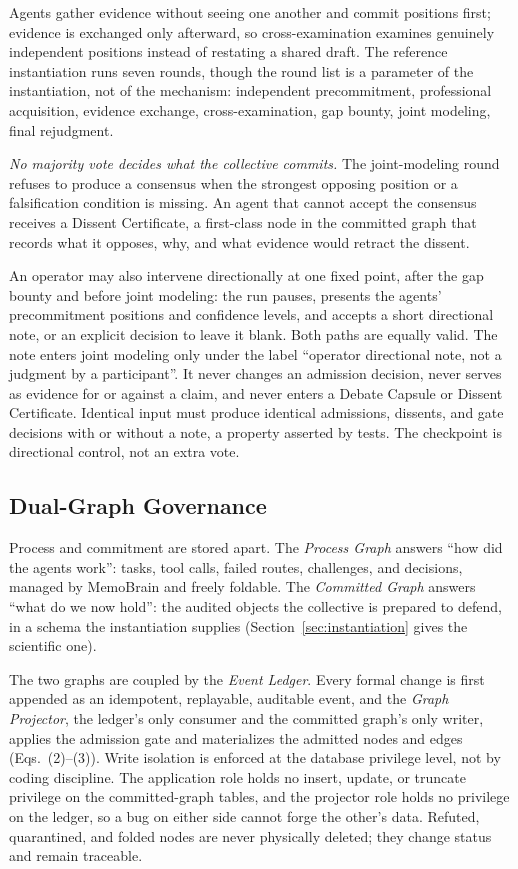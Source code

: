 Agents gather evidence without seeing one another and commit positions first;
evidence is exchanged only afterward, so cross-examination examines genuinely
independent positions instead of restating a shared draft. The reference
instantiation runs seven rounds, though the round list is a parameter of the
instantiation, not of the mechanism: independent precommitment,
professional acquisition, evidence exchange, cross-examination, gap bounty,
joint modeling, final rejudgment.

\emph{No majority vote decides what the collective commits.} The joint-modeling
round refuses to produce a consensus when the strongest opposing position or a
falsification condition is missing. An agent that cannot accept the consensus
receives a Dissent Certificate, a first-class node in the committed graph that
records what it opposes, why, and what evidence would retract the dissent.

An operator may also intervene directionally at one fixed point, after the gap
bounty and before joint modeling: the run pauses, presents the agents'
precommitment positions and confidence levels, and accepts a short directional
note, or an explicit decision to leave it blank. Both paths are equally valid.
The note enters joint modeling only under the label ``operator directional
note, not a judgment by a participant''. It never changes an admission
decision, never serves as evidence for or against a claim, and never enters a
Debate Capsule or Dissent Certificate. Identical input must produce identical
admissions, dissents, and gate decisions with or without a note, a property
asserted by tests. The checkpoint is directional control, not an extra vote.

\subsection{Dual-Graph Governance}
\label{sec:dualgraph}

Process and commitment are stored apart. The \emph{Process Graph} answers ``how
did the agents work'': tasks, tool calls, failed routes, challenges, and
decisions, managed by MemoBrain and freely foldable. The \emph{Committed Graph}
answers ``what do we now hold'': the audited objects the collective is prepared
to defend, in a schema the instantiation supplies
(Section~\ref{sec:instantiation} gives the scientific one).

The two graphs are coupled by the \emph{Event Ledger}. Every formal change is
first appended as an idempotent, replayable, auditable event, and the
\emph{Graph Projector}, the ledger's only consumer and the committed graph's
only writer, applies the admission gate and materializes the admitted nodes and
edges (Eqs.~(2)--(3)). Write isolation is enforced at the database privilege
level, not by coding discipline. The application role holds no insert, update,
or truncate privilege on the committed-graph tables, and the projector role
holds no privilege on the ledger, so a bug on either side cannot forge the
other's data. Refuted, quarantined, and folded nodes are never physically
deleted; they change status and remain traceable.


